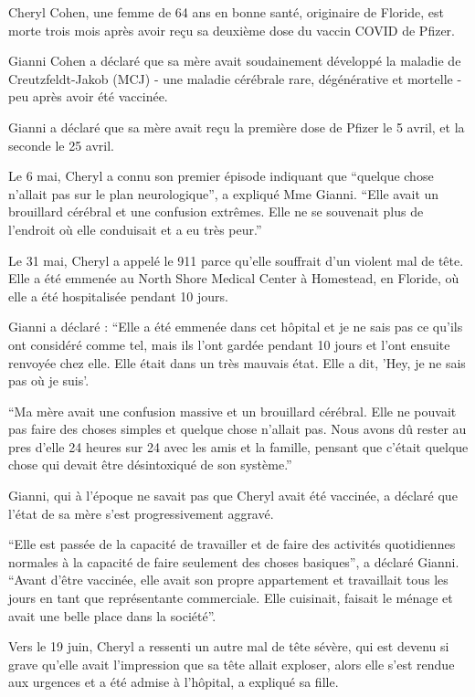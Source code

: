 Cheryl Cohen, une femme de 64 ans en bonne santé, originaire de Floride, est
morte trois mois après avoir reçu sa deuxième dose du vaccin COVID de Pfizer.

Gianni Cohen a déclaré que sa mère avait soudainement développé la maladie de
Creutzfeldt-Jakob (MCJ) - une maladie cérébrale rare, dégénérative et mortelle -
peu après avoir été vaccinée.

Gianni a déclaré que sa mère avait reçu la première dose de Pfizer le 5 avril,
et la seconde le 25 avril.

Le 6 mai, Cheryl a connu son premier épisode indiquant que “quelque chose
n'allait pas sur le plan neurologique”, a expliqué Mme Gianni. “Elle avait un
brouillard cérébral et une confusion extrêmes. Elle ne se souvenait plus de
l'endroit où elle conduisait et a eu très peur.”

Le 31 mai, Cheryl a appelé le 911 parce qu'elle souffrait d'un violent mal de
tête. Elle a été emmenée au North Shore Medical Center à Homestead, en Floride,
où elle a été hospitalisée pendant 10 jours.

Gianni a déclaré : “Elle a été emmenée dans cet hôpital et je ne sais pas ce
qu'ils ont considéré comme tel, mais ils l'ont gardée pendant 10 jours et l'ont
ensuite renvoyée chez elle. Elle était dans un très mauvais état. Elle a dit,
'Hey, je ne sais pas où je suis'.

“Ma mère avait une confusion massive et un brouillard cérébral. Elle ne pouvait
pas faire des choses simples et quelque chose n'allait pas. Nous avons dû rester
au pres d'elle 24 heures sur 24 avec les amis et la famille, pensant que c'était
quelque chose qui devait être désintoxiqué de son système.”

Gianni, qui à l'époque ne savait pas que Cheryl avait été vaccinée, a déclaré
que l'état de sa mère s'est progressivement aggravé.

“Elle est passée de la capacité de travailler et de faire des activités
quotidiennes normales à la capacité de faire seulement des choses basiques”, a
déclaré Gianni. “Avant d'être vaccinée, elle avait son propre appartement et
travaillait tous les jours en tant que représentante commerciale. Elle
cuisinait, faisait le ménage et avait une belle place dans la société”.

Vers le 19 juin, Cheryl a ressenti un autre mal de tête sévère, qui est devenu
si grave qu'elle avait l'impression que sa tête allait exploser, alors elle
s'est rendue aux urgences et a été admise à l'hôpital, a expliqué sa fille.

